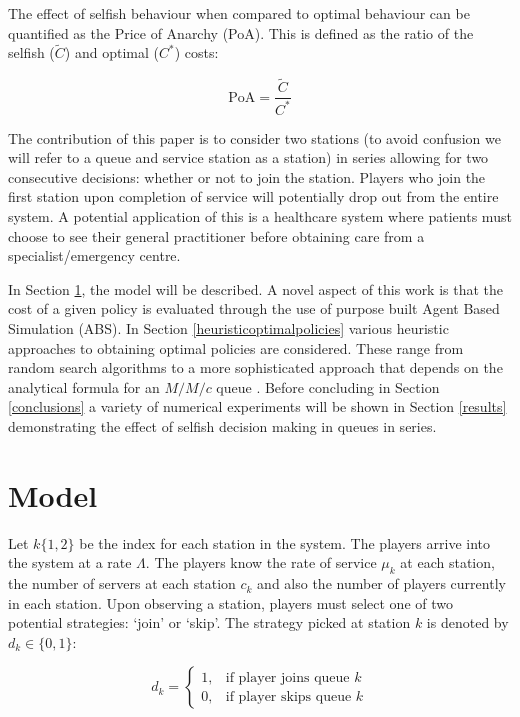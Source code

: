 \documentclass[12pt]{article}
\newcommand{\PoA}{\text{PoA}}
\begin{document}
The effect of selfish behaviour when compared to optimal behaviour can be quantified as the Price of Anarchy (PoA).
This is defined as the ratio of the selfish ($\tilde C$) and optimal ($C^*$) costs:

$$
\PoA = \frac{\tilde C}{C^*}
$$

The contribution of this paper is to consider two stations (to avoid confusion we will refer to a queue and service station as a station) in series allowing for two consecutive decisions: whether or not to join the station.
Players who join the first station upon completion of service will potentially drop out from the entire system.
A potential application of this is a healthcare system where patients must choose to see their general practitioner before obtaining care from a specialist/emergency centre.

In Section \ref{model}, the model will be described.
A novel aspect of this work is that the cost of a given policy is evaluated through the use of purpose built Agent Based Simulation (ABS).
In Section \ref{heuristicoptimalpolicies} various heuristic approaches to obtaining optimal policies are considered.
These range from random search algorithms to a more sophisticated approach that depends on the analytical formula for an $M/M/c$ queue \cite{Stewart}.
Before concluding in Section \ref{conclusions} a variety of numerical experiments will be shown in Section \ref{results} demonstrating the effect of selfish decision making in queues in series.

\section{Model}\label{model}

Let $k\{1,2\}$ be the index for each station in the system.
The players arrive into the system at a rate $\Lambda$.
The players know the rate of service $\mu_k$ at each station, the number of servers at each station $c_k$ and also the number of players currently in each station.
Upon observing a station, players must select one of two potential strategies: `join' or `skip'.
The strategy picked at station $k$ is denoted by $d_k\in\{0,1\}$:

\begin{equation}\label{eq:decision}
    d_k=
\begin{cases}
    1,& \text{if player joins queue } k \\
    0,& \text{if player skips queue } k
\end{cases}
\end{equation}
\end{document}
